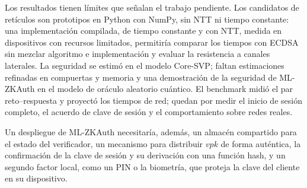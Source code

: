 Los resultados tienen límites que señalan el trabajo pendiente. Los candidatos de retículos
son prototipos en Python con NumPy, sin NTT ni tiempo constante: una implementación
compilada, de tiempo constante y con NTT, medida en dispositivos con recursos limitados,
permitiría comparar los tiempos con ECDSA sin mezclar algoritmo e implementación y evaluar
la resistencia a canales laterales. La seguridad se estimó en el modelo Core-SVP; faltan
estimaciones refinadas en compuertas y memoria y una demostración de la seguridad de
ML-ZKAuth en el modelo de oráculo aleatorio cuántico. El benchmark midió el par
reto--respuesta y proyectó los tiempos de red; quedan por medir el inicio de sesión
completo, el acuerdo de clave de sesión y el comportamiento sobre redes reales.

Un despliegue de ML-ZKAuth necesitaría, además, un almacén compartido para el estado del
verificador, un mecanismo para distribuir $vpk$ de forma auténtica, la confirmación de la
clave de sesión y su derivación con una función hash, y un segundo factor local, como un
PIN o la biometría, que proteja la clave del cliente en su dispositivo.
